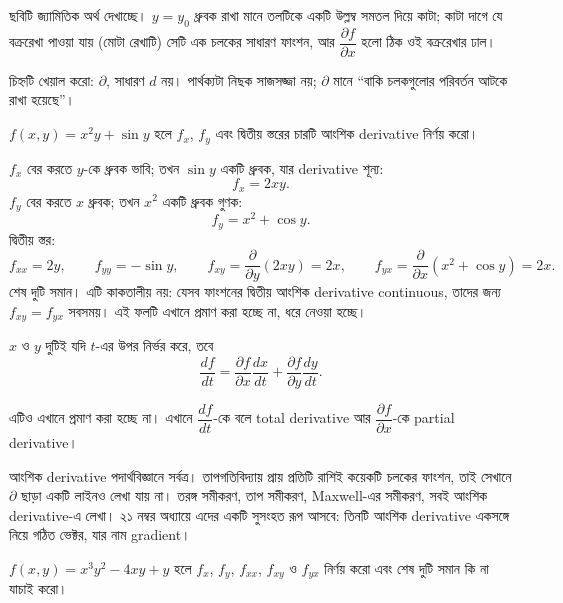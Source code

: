 \documentclass[11pt]{article}
\begin{document}
ছবিটি জ্যামিতিক অর্থ দেখাচ্ছে। $y = y_{0}$ ধ্রুবক রাখা মানে তলটিকে একটি উল্লম্ব
সমতল দিয়ে কাটা; কাটা দাগে যে বক্ররেখা পাওয়া যায় (মোটা রেখাটি) সেটি এক চলকের
সাধারণ ফাংশন, আর $\dfrac{\partial f}{\partial x}$ হলো ঠিক ওই বক্ররেখার ঢাল।

চিহ্নটি খেয়াল করো: $\partial$, সাধারণ $d$ নয়। পার্থক্যটা নিছক সাজসজ্জা নয়;
$\partial$ মানে ``বাকি চলকগুলোর পরিবর্তন  আটকে রাখা হয়েছে''।

\begin{example}
$f(x,y) = x^{2}y + \sin y$ হলে $f_{x}$, $f_{y}$ এবং দ্বিতীয় স্তরের চারটি
আংশিক derivative নির্ণয় করো।
\end{example}

\begin{solbox}
$f_{x}$ বের করতে $y$-কে ধ্রুবক ভাবি; তখন $\sin y$ একটি ধ্রুবক, যার derivative
শূন্য:
\[
  f_{x} = 2xy .
\]
$f_{y}$ বের করতে $x$ ধ্রুবক; তখন $x^{2}$ একটি ধ্রুবক গুণক:
\[
  f_{y} = x^{2} + \cos y .
\]
দ্বিতীয় স্তর:
\[
  f_{xx} = 2y, \qquad f_{yy} = -\sin y, \qquad
  f_{xy} = \frac{\partial}{\partial y}(2xy) = 2x, \qquad
  f_{yx} = \frac{\partial}{\partial x}\left( x^{2}+\cos y \right) = 2x .
\]
শেষ দুটি সমান। এটি কাকতালীয় নয়: যেসব ফাংশনের দ্বিতীয় আংশিক derivative
continuous, তাদের জন্য $f_{xy} = f_{yx}$ সবসময়। এই ফলটি এখানে প্রমাণ করা হচ্ছে
না, ধরে নেওয়া হচ্ছে।
\end{solbox}

\begin{idea}
$x$ ও $y$ দুটিই যদি $t$-এর উপর নির্ভর করে, তবে
\[
  \frac{df}{dt} = \frac{\partial f}{\partial x}\frac{dx}{dt}
                + \frac{\partial f}{\partial y}\frac{dy}{dt} .
\]
\end{idea}

এটিও এখানে প্রমাণ করা হচ্ছে না। এখানে
$\dfrac{df}{dt}$-কে বলে total derivative আর $\dfrac{\partial f}{\partial x}$-কে
partial derivative।

\begin{remark}
আংশিক derivative পদার্থবিজ্ঞানে সর্বত্র। তাপগতিবিদ্যায় প্রায় প্রতিটি রাশিই
কয়েকটি চলকের ফাংশন, তাই সেখানে $\partial$ ছাড়া একটি লাইনও লেখা যায় না।
তরঙ্গ সমীকরণ, তাপ সমীকরণ, Maxwell-এর সমীকরণ, সবই আংশিক derivative-এ লেখা।
২১ নম্বর অধ্যায়ে এদের একটি সুসংহত রূপ আসবে: তিনটি আংশিক derivative একসঙ্গে
নিয়ে গঠিত ভেক্টর, যার নাম gradient।
\end{remark}

 $f(x,y) = x^{3}y^{2} - 4xy + y$ হলে $f_{x}$, $f_{y}$, $f_{xx}$,
$f_{xy}$ ও $f_{yx}$ নির্ণয় করো এবং শেষ দুটি সমান কি না যাচাই করো।
\end{document}
